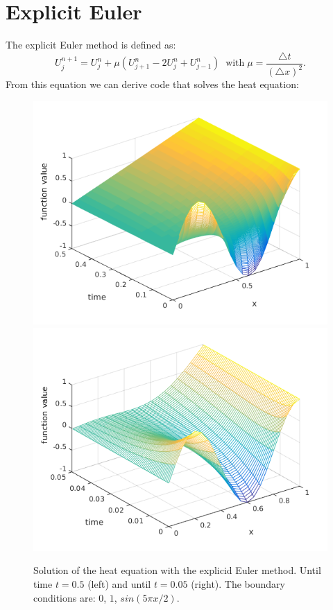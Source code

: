 \documentclass[ twoside,openright,titlepage,numbers=noenddot,headinclude,%
                footinclude=true,cleardoublepage=empty,abstractoff, %
                BCOR=5mm,paper=a4,fontsize=11pt,%
                ngerman,american,%
                ]{scrreprt}
\begin{document}
\section{Explicit Euler}
The explicit Euler method is defined as:
\begin{equation}
U_j^{n+1} = U_j^n + \mu (U_{j+1}^n - 2U_j^n + U_{j-1}^n ) \;\; \text{with} \; \mu =\frac{\triangle t}{(\triangle x)^2}.
\end{equation}
From this equation we can derive code that solves the heat equation:

\begin{figure}
\includegraphics[scale = 0.45]{images/EulerHeat05.png}
\includegraphics[scale = 0.45]{images/EulerHeat005.png}
\caption{Solution of the heat equation with the explicid Euler method. Until time $t = 0.5$ (left) and until $t = 0.05$ (right). The boundary conditions are: $0$, $1$, $sin(5\pi x/2)$.}
\label{fig:heatEulerStable}
\end{figure}
\end{document}
